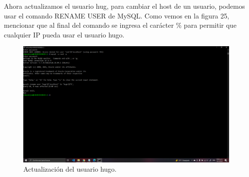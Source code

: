 \documentclass[11pt]{article}
\begin{document}
		Ahora actualizamos el usuario hug, para cambiar el host de un usuario, podemos usar el comando RENAME USER de MySQL. Como vemos en la figura 25, mencionar que al final del comando se ingresa el carácter \% para permitir que cualquier IP pueda usar el usuario hugo.
		\begin{figure}[H]
			\centering
			\includegraphics[scale=0.34]{resources/conexionesremotasMYSQ3.png}
			\caption{Actualización del usuario hugo.}\label{fig:picture}
		\end{figure}
		
\end{document}
